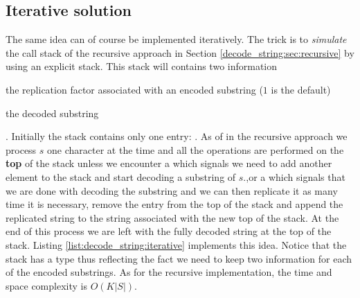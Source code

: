  \subsection{Iterative solution}
 \label{decode_string:sec:iterative}
The same idea can of course be implemented iteratively. The trick is to \textit{simulate} the call
stack of the recursive approach in Section \ref{decode_string:sec:recursive} by using an explicit
stack. This stack will contains two information 
\begin{enumerate*}
	\item the replication factor associated with an encoded substring ($1$ is the default)
	\item the decoded substring \end{enumerate*}. Initially the stack contains only one entry: 
	. 
	As of in the recursive approach we process $s$ one character  at the time and all the
operations are performed on the \textbf{top} of the stack unless we encounter a \inline{'['} which
signals we need to add another element to the stack and start decoding a substring of $s$.,or a
\inline{']'} which signals that we are done with decoding the substring and we can then replicate it
as many time it is necessary, remove the entry from the top of the stack and append the replicated
string to the string associated with the new top of the stack. At the end of this process we are
left with the fully decoded string at the top of the stack. Listing
\ref{list:decode_string:iterative} implements this idea. Notice that the stack has a type
 thus reflecting the fact we need to keep two
information for each of the encoded substrings.
As for the recursive implementation, the time and space complexity is $O(K|S|)$.


